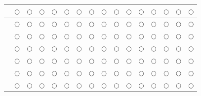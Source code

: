 \documentclass[12pt]{article}
\begin{document}
\begin{center}
\begin{longtable}{ |p{6cm}|c|c|c|c|c|c|c|c|c|c|c|c|c|c|c|}
&$\bigcirc$&$\bigcirc$
&$\bigcirc$&$\bigcirc$&$\bigcirc$&$\bigcirc$&$\bigcirc$&$\bigcirc$&$\bigcirc$&$\bigcirc$&$\bigcirc$&$\bigcirc$&$\bigcirc$&$\bigcirc$&$\bigcirc$\\
\hline

&$\bigcirc$&$\bigcirc$
&$\bigcirc$&$\bigcirc$&$\bigcirc$&$\bigcirc$&$\bigcirc$&$\bigcirc$&$\bigcirc$&$\bigcirc$&$\bigcirc$&$\bigcirc$&$\bigcirc$&$\bigcirc$&$\bigcirc$\\
\hline

&$\bigcirc$&$\bigcirc$
&$\bigcirc$&$\bigcirc$&$\bigcirc$&$\bigcirc$&$\bigcirc$&$\bigcirc$&$\bigcirc$&$\bigcirc$&$\bigcirc$&$\bigcirc$&$\bigcirc$&$\bigcirc$&$\bigcirc$\\
\hline

&$\bigcirc$&$\bigcirc$
&$\bigcirc$&$\bigcirc$&$\bigcirc$&$\bigcirc$&$\bigcirc$&$\bigcirc$&$\bigcirc$&$\bigcirc$&$\bigcirc$&$\bigcirc$&$\bigcirc$&$\bigcirc$&$\bigcirc$\\
\hline

&$\bigcirc$&$\bigcirc$
&$\bigcirc$&$\bigcirc$&$\bigcirc$&$\bigcirc$&$\bigcirc$&$\bigcirc$&$\bigcirc$&$\bigcirc$&$\bigcirc$&$\bigcirc$&$\bigcirc$&$\bigcirc$&$\bigcirc$\\
\hline

&$\bigcirc$&$\bigcirc$
&$\bigcirc$&$\bigcirc$&$\bigcirc$&$\bigcirc$&$\bigcirc$&$\bigcirc$&$\bigcirc$&$\bigcirc$&$\bigcirc$&$\bigcirc$&$\bigcirc$&$\bigcirc$&$\bigcirc$\\
\hline
&$\bigcirc$&$\bigcirc$
&$\bigcirc$&$\bigcirc$&$\bigcirc$&$\bigcirc$&$\bigcirc$&$\bigcirc$&$\bigcirc$&$\bigcirc$&$\bigcirc$&$\bigcirc$&$\bigcirc$&$\bigcirc$&$\bigcirc$\\
\hline
\end{longtable}
\end{center}
\end{document}
